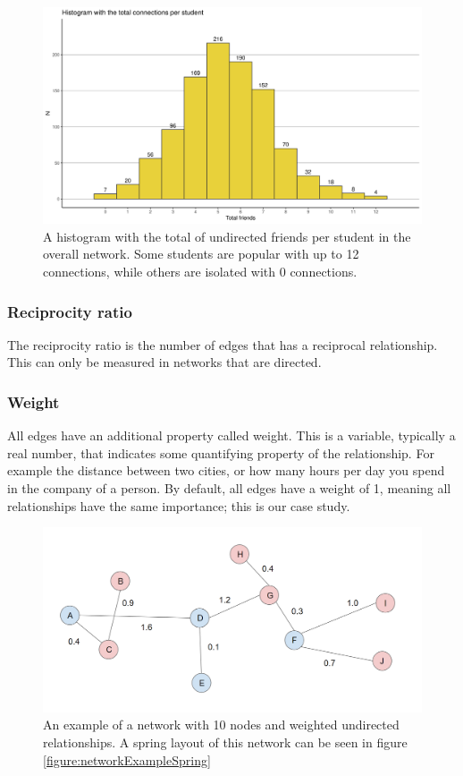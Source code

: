     \begin{figure}[h!]
        \centering
            \includegraphics[width=0.7\linewidth]{figures/Networks/Histograms/Histogram_completeTable_OverallConnections.png} 
        \caption{A histogram with the total of undirected friends per student in the overall network. Some students are popular with up to 12 connections, while others are isolated with 0 connections.}
        \label{figure:networksHistogramFriendship}
    \end{figure}  

\subsubsection{Reciprocity ratio}

The reciprocity ratio is the number of edges that has a reciprocal relationship. This can only be measured in networks that are directed.

\subsubsection{Weight}

All edges have an additional property called weight. This is a variable, typically a real number, that indicates some quantifying property of the relationship. For example the distance between two cities, or how many hours per day you spend in the company of a person. By default, all edges have a weight of 1, meaning all relationships have the same importance; this is our case study.

    \begin{figure}[h!]
        \centering
            \includegraphics[width=0.7\linewidth]{figures/Networks/Concepts/edgesValues.png} 
        \caption{An example of a network with 10 nodes and weighted undirected relationships. A spring layout of this network can be seen in figure \ref{figure:networkExampleSpring}}
        \label{figure:networkExampleWeights}
    \end{figure}

